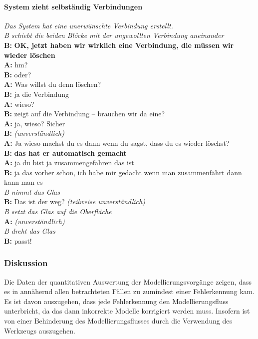 \paragraph{System zieht selbständig Verbindungen}

\begin{transkript}
\emph{Das System hat eine unerwünschte Verbindung erstellt.} \\
\emph{B schiebt die beiden Blöcke mit der ungewollten Verbindung aneinander} \\
\textbf{B:} \textbf{OK, jetzt haben wir wirklich eine Verbindung, die müssen wir wieder löschen} \\
\textbf{A:} hm? \\
\textbf{B:} oder? \\
\textbf{A:} Was willst du denn löschen? \\
\textbf{B:} ja die Verbindung \\
\textbf{A:} wieso? \\
\textbf{B:} zeigt auf die Verbindung – brauchen wir da eine? \\
\textbf{A:} ja, wieso? Sicher \\
\textbf{B:} \emph{(unverständlich)} \\
\textbf{A:} Ja wieso machst du es dann wenn du sagst, dass du es wieder löschst? \\
\textbf{B:} \textbf{das hat er automatisch gemacht} \\
\textbf{A:} ja du bist ja zusammengefahren das ist \\
\textbf{B:} ja das vorher schon, ich habe mir gedacht wenn man zusammenfährt dann kann man es \\
\emph{B nimmt das Glas} \\
\textbf{B:} Das ist der weg? \emph{(teilweise unverständlich)} \\
\emph{B setzt das Glas auf die Oberfläche} \\
\textbf{A:} \emph{(unverständlich)} \\
\emph{B dreht das Glas} \\
\textbf{B:} passt! \\
\end{transkript}

\subsubsection{Diskussion} 

Die Daten der quantitativen Auswertung der Modellierungsvorgänge zeigen, dass es in annähernd allen betrachteten Fällen zu zumindest einer Fehlerkennung kam. Es ist davon auszugehen, dass jede Fehlerkennung den Modellierungsfluss unterbricht, da das dann inkorrekte Modelle korrigiert werden muss. Insofern ist von einer Behinderung des Modellierungsflusses durch die Verwendung des Werkzeugs auszugehen.

